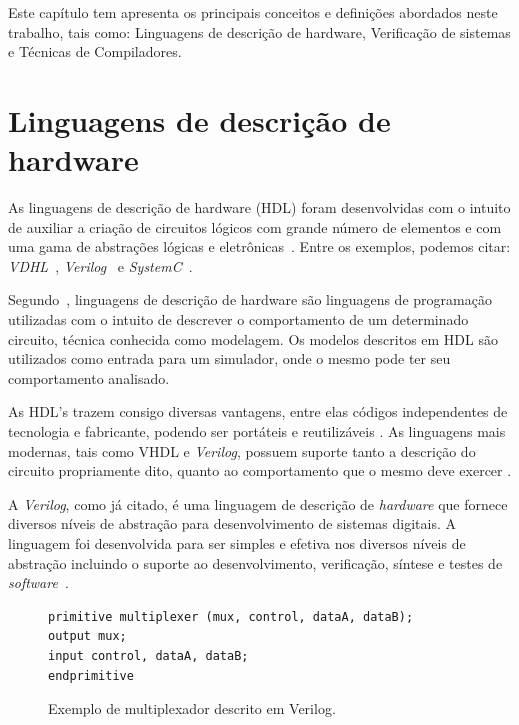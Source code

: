 \label{chapter:conceitos}
Este capítulo tem apresenta os principais conceitos e definições abordados neste trabalho, tais como: Linguagens de descrição de hardware, Verificação de sistemas e Técnicas de Compiladores.

\section{Linguagens de descrição de hardware}

As linguagens de descrição de hardware (HDL) foram desenvolvidas com o intuito de auxiliar a criação de circuitos lógicos com grande número de elementos e com uma gama de abstrações lógicas e eletrônicas~\cite{thomas2008verilog}. Entre os exemplos, podemos citar: \textit{VDHL}~\cite{IEEEVHDLLanguage}, \textit{Verilog}~\cite{IEEEVerilogLanguage} e \textit{SystemC}~\cite{IEEESystemCLanguage}.

\par
Segundo~\cite{christen1999vhdl}, linguagens de descrição de hardware são linguagens de programação utilizadas com o intuito de descrever o comportamento de um determinado circuito, técnica conhecida como modelagem. Os modelos descritos em HDL são utilizados como entrada para um simulador, onde o mesmo pode ter seu comportamento analisado.

\par
As HDL's trazem consigo diversas vantagens, entre elas códigos independentes de tecnologia e fabricante, podendo ser portáteis e reutilizáveis \cite{cappelattipraticando}. As linguagens mais modernas, tais como VHDL e \textit{Verilog}, possuem suporte tanto a descrição do circuito propriamente dito, quanto ao comportamento que o mesmo deve exercer \cite{christen1999vhdl}.

\par
A \textit{Verilog}, como já citado, é uma linguagem de descrição de \textit{hardware} que fornece diversos níveis de abstração para desenvolvimento de sistemas digitais\cite{thomas2008verilog}. A linguagem foi desenvolvida para ser simples e efetiva nos diversos níveis de abstração incluindo o suporte ao desenvolvimento, verificação, síntese e testes de \textit{software}~\cite{IEEEVerilogLanguage}.

\begin{figure}[H]
\caption{\label{fig:mux_verilog} Exemplo de multiplexador descrito em Verilog.}
	\begin{center}
    \begin{minipage}{0.7\textwidth}
    \begin{lstlisting}       
primitive multiplexer (mux, control, dataA, dataB);
output mux;
input control, dataA, dataB;
endprimitive
\end{lstlisting}
    \end{minipage}
	\end{center}
\end{figure}

